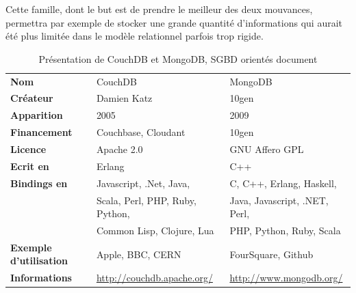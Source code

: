 \documentclass[11pt]{article}
\begin{document}
Cette famille, dont le but est de prendre le meilleur des deux mouvances, permettra par exemple de stocker une grande quantité d'informations qui aurait été plus limitée dans le modèle relationnel parfois trop rigide.
\begin{table}[H]
  \centering
  \begin{tabular}{l | l | l}
    \textbf{Nom} & CouchDB & MongoDB \\
    \textbf{Créateur} & Damien Katz & 10gen \\
    \textbf{Apparition} & 2005 &  2009 \\
    \textbf{Financement} & Couchbase, Cloudant & 10gen \\
    \textbf{Licence} & Apache 2.0 & GNU Affero GPL\\
    \textbf{Ecrit en} & Erlang & C++\\
    \textbf{Bindings en} & Javascript, .Net, Java, & C, C++, Erlang, Haskell, \\
    & Scala, Perl, PHP, Ruby, Python, & Java, Javascript, .NET, Perl,\\
    & Common Lisp, Clojure, Lua &  PHP, Python, Ruby, Scala \\
    \textbf{Exemple d'utilisation} & Apple, BBC, CERN & FourSquare, Github \\
    \textbf{Informations} & \url{http://couchdb.apache.org/} & \url{http://www.mongodb.org/}
  \end{tabular}
  \caption{Présentation de CouchDB et MongoDB, SGBD orientés document}
\end{table}
\end{document}

